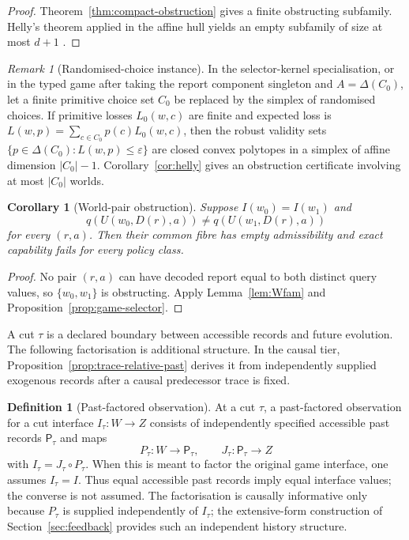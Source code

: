 \documentclass[11pt]{article}
\theoremstyle{plain}
\newtheorem{corollary}[theorem]{Corollary}
\theoremstyle{definition}
\newtheorem{definition}[theorem]{Definition}
\theoremstyle{remark}
\newtheorem{remark}[theorem]{Remark}
\newcommand{\eps}{\varepsilon}
\begin{document}
\begin{proof}
Theorem~\ref{thm:compact-obstruction} gives a finite obstructing subfamily.
Helly's theorem applied in the affine hull yields an empty subfamily of size at
most $d+1$ \cite{eckhoff}.
\end{proof}

\begin{remark}[Randomised-choice instance]
In the selector-kernel specialisation, or in the typed game after taking the
report component singleton and $A=\Delta(C_0)$, let a finite primitive choice
set $C_0$ be replaced by the simplex of randomised choices. If primitive losses
$L_0(w,c)$ are finite and expected loss is
$L(w,p)=\sum_{c\in C_0}p(c)L_0(w,c)$, then the robust validity sets
$\{p\in\Delta(C_0):L(w,p)\le\eps\}$ are closed convex polytopes in a
simplex of affine dimension $|C_0|-1$. Corollary~\ref{cor:helly} gives an
obstruction certificate involving at most $|C_0|$ worlds.
\end{remark}

\begin{corollary}[World-pair obstruction]\label{cor:worldpair}
Suppose $I(w_0)=I(w_1)$ and
\[
q(U(w_0,D(r),a))\ne q(U(w_1,D(r),a))
\]
for every $(r,a)$. Then their common fibre has empty admissibility and exact
capability fails for every policy class.
\end{corollary}

\begin{proof}
No pair $(r,a)$ can have decoded report equal to both distinct query values, so
$\{w_0,w_1\}$ is obstructing. Apply Lemma~\ref{lem:Wfam} and
Proposition~\ref{prop:game-selector}.
\end{proof}

A cut $\tau$ is a declared boundary between accessible records and future
evolution. The following factorisation is additional structure. In the causal
tier, Proposition~\ref{prop:trace-relative-past} derives it from independently
supplied exogenous records after a causal predecessor trace is fixed.

\begin{definition}[Past-factored observation]\label{def:past-factor}
At a cut $\tau$, a past-factored observation for a cut interface
$I_\tau:W\to Z$ consists of independently specified accessible past
records $\mathsf P_\tau$ and maps
\[
P_\tau:W\to\mathsf P_\tau,\qquad J_\tau:\mathsf P_\tau\to Z
\]
with $I_\tau=J_\tau\circ P_\tau$. When this is meant to factor the original
game interface, one assumes $I_\tau=I$. Thus equal accessible past records imply
equal interface values; the converse is not assumed. The factorisation is causally
informative only because $P_\tau$ is supplied independently of $I_\tau$; the
extensive-form construction of Section~\ref{sec:feedback} provides such an
independent history structure.
\end{definition}
\end{document}
